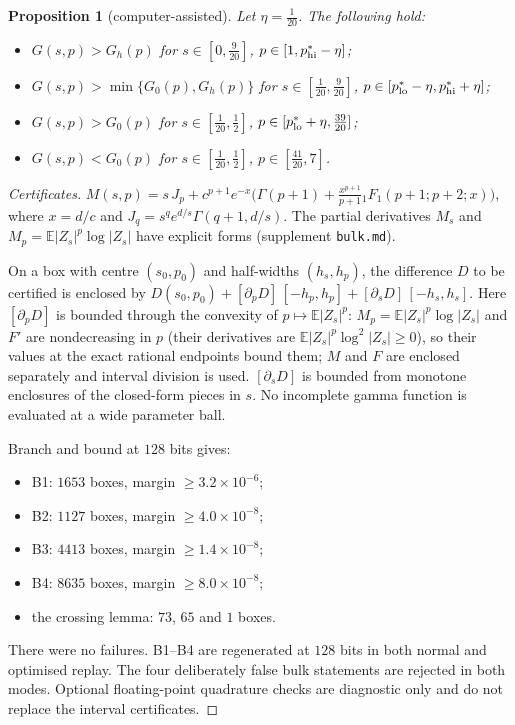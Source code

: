 \documentclass[11pt]{article}
\newtheorem{proposition}[theorem]{Proposition}
\theoremstyle{remark}
\newcommand{\E}{\mathbb E}
\begin{document}
\begin{proposition}[computer-assisted]\label{prop:bulk}
Let $\eta=\frac1{20}$. The following hold:
\begin{itemize}
\item[(B1)] $G(s,p)>G_h(p)$ for $s\in[0,\frac9{20}]$, $p\in[1,p^*_{\rm hi}-\eta]$;
\item[(B2)] $G(s,p)>\min\{G_0(p),G_h(p)\}$ for $s\in[\frac1{20},\frac9{20}]$, $p\in[p^*_{\rm lo}-\eta,p^*_{\rm hi}+\eta]$;
\item[(B3)] $G(s,p)>G_0(p)$ for $s\in[\frac1{20},\frac12]$, $p\in[p^*_{\rm lo}+\eta,\frac{39}{20}]$;
\item[(B4)] $G(s,p)<G_0(p)$ for $s\in[\frac1{20},\frac12]$, $p\in[\frac{41}{20},7]$.
\end{itemize}
\end{proposition}
\begin{proof}[Certificates]
$M(s,p)=s\,J_p+c^{p+1}e^{-x}\bigl(\Gamma(p+1)+\frac{x^{p+1}}{p+1}{}_1F_1(p+1;p+2;x)\bigr)$, where $x=d/c$ and $J_q=s^qe^{d/s}\Gamma(q+1,d/s)$. The partial derivatives $M_s$ and $M_p=\E|Z_s|^p\log|Z_s|$ have explicit forms (supplement \texttt{bulk.md}).

On a box with centre $(s_0,p_0)$ and half-widths $(h_s,h_p)$, the difference $D$ to be certified is enclosed by $D(s_0,p_0)+[\partial_pD]\,[-h_p,h_p]+[\partial_sD]\,[-h_s,h_s]$. Here $[\partial_pD]$ is bounded through the convexity of $p\mapsto\E|Z_s|^p$: $M_p=\E|Z_s|^p\log|Z_s|$ and $F'$ are nondecreasing in $p$ (their derivatives are $\E|Z_s|^p\log^2|Z_s|\ge0$), so their values at the exact rational endpoints bound them; $M$ and $F$ are enclosed separately and interval division is used. $[\partial_sD]$ is bounded from monotone enclosures of the closed-form pieces in $s$. No incomplete gamma function is evaluated at a wide parameter ball.

Branch and bound at $128$ bits gives:
\begin{itemize}
\item B1: $1653$ boxes, margin $\ge3.2\times10^{-6}$;
\item B2: $1127$ boxes, margin $\ge4.0\times10^{-8}$;
\item B3: $4413$ boxes, margin $\ge1.4\times10^{-8}$;
\item B4: $8635$ boxes, margin $\ge8.0\times10^{-8}$;
\item the crossing lemma: $73$, $65$ and $1$ boxes.
\end{itemize}
There were no failures. B1--B4 are regenerated at $128$ bits in both normal and optimised replay. The four deliberately false bulk statements are rejected in both modes. Optional floating-point quadrature checks are diagnostic only and do not replace the interval certificates.
\end{proof}
\end{document}
